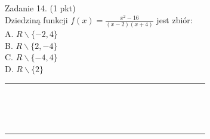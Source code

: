 \documentclass[10pt]{article}
\begin{document}
Zadanie 14. (1 pkt)\\
Dziedziną funkcji \(f(x)=\frac{x^{2}-16}{(x-2)(x+4)}\) jest zbiór:\\
A. \(R \backslash\{-2,4\}\)\\
B. \(R \backslash\{2,-4\}\)\\
C. \(R \backslash\{-4,4\}\)\\
D. \(R \backslash\{2\}\)

\begin{center}
\begin{tabular}{|c|c|c|c|c|c|c|c|c|c|c|c|c|c|c|c|c|c|c|c|c|c|c|c|}
\hline
 &  &  &  &  &  &  &  &  &  &  &  &  &  &  &  &  &  &  &  &  &  &  &  \\
\hline
 &  &  &  &  &  &  &  &  &  &  &  &  &  &  &  &  &  &  &  &  &  &  &  \\
\hline
 &  &  &  &  &  &  &  &  &  &  &  &  &  &  &  &  &  &  &  &  &  &  &  \\
\hline
 &  &  &  &  &  &  &  &  &  &  &  &  &  &  &  &  &  &  &  &  &  &  &  \\
\hline
 &  &  &  &  &  &  &  &  &  &  &  &  &  &  &  &  &  &  &  &  &  &  &  \\
\hline
 &  &  &  &  &  &  &  &  &  &  &  &  &  &  &  &  &  &  &  &  &  &  &  \\
\hline
 &  &  &  &  &  &  &  &  &  &  &  &  &  &  &  &  &  &  &  &  &  &  &  \\
\hline
 &  &  &  &  &  &  &  &  &  &  &  &  &  &  &  &  &  &  &  &  &  &  &  \\
\hline
 &  &  &  &  &  &  &  &  &  &  &  &  &  &  &  &  &  &  &  &  &  &  &  \\
\hline
 &  &  &  &  &  &  &  &  &  &  &  &  &  &  &  &  &  &  &  &  &  &  &  \\
\hline
 &  &  &  &  &  &  &  &  &  &  &  &  &  &  &  &  &  &  &  &  &  &  &  \\
\hline
 &  &  &  &  &  &  &  &  &  &  &  &  &  &  &  &  &  &  &  &  &  &  &  \\
\hline
 &  &  &  &  &  &  &  &  &  &  &  &  &  &  &  &  &  &  &  &  &  &  &  \\
\hline
 &  &  &  &  &  &  &  &  &  &  &  &  &  &  &  &  &  &  &  &  &  &  &  \\
\hline
 &  &  &  &  &  &  &  &  &  &  &  &  &  &  &  &  &  &  &  &  &  &  &  \\
\hline
 &  &  &  &  &  &  &  &  &  &  &  &  &  &  &  &  &  &  &  &  &  &  &  \\
\hline
 &  &  &  &  &  &  &  &  &  &  &  &  &  &  &  &  &  &  &  &  &  &  &  \\

\end{tabular}
\end{center}
\end{document}
